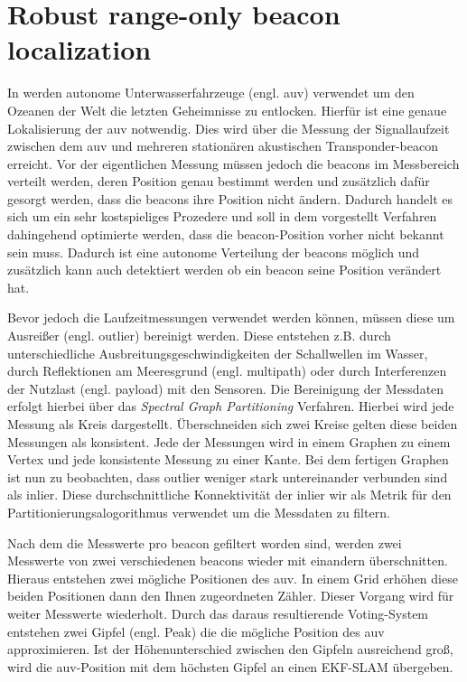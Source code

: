 \section{Robust range-only beacon localization}

In  \cite{olson2004robust} werden autonome Unterwasserfahrzeuge (engl. \gls{auv}) verwendet um den Ozeanen der Welt die letzten Geheimnisse zu entlocken. Hierfür ist eine genaue Lokalisierung der \gls{auv} notwendig. Dies wird über die Messung der Signallaufzeit zwischen dem \gls{auv} und mehreren stationären akustischen Transponder-\Gls{beacon} erreicht. Vor der eigentlichen Messung müssen jedoch die \Glspl{beacon} im Messbereich verteilt werden, deren Position genau bestimmt werden und zusätzlich dafür gesorgt werden, dass die \Glspl{beacon} ihre Position nicht ändern. Dadurch handelt es sich um ein sehr kostspieliges Prozedere und soll in dem vorgestellt Verfahren dahingehend optimierte werden, dass die \Gls{beacon}-Position vorher nicht bekannt sein muss. Dadurch ist eine autonome Verteilung der \Glspl{beacon} möglich und zusätzlich kann auch detektiert werden ob ein \Gls{beacon} seine Position verändert hat.

Bevor jedoch die Laufzeitmessungen verwendet werden können, müssen diese um Ausreißer (engl. \Gls{outlier}) bereinigt werden. Diese entstehen z.B. durch unterschiedliche Ausbreitungsgeschwindigkeiten der Schallwellen im Wasser, durch Reflektionen am Meeresgrund (engl. \Gls{multipath}) oder durch Interferenzen der Nutzlast (engl. \Gls{payload}) mit den Sensoren. Die Bereinigung der Messdaten erfolgt hierbei über das \textit{Spectral Graph Partitioning} Verfahren. Hierbei wird jede Messung als Kreis dargestellt. Überschneiden sich zwei Kreise gelten diese beiden Messungen als konsistent. Jede der Messungen wird in einem Graphen zu einem Vertex und jede konsistente Messung zu einer Kante. Bei dem fertigen Graphen ist nun zu beobachten, dass \Gls{outlier} weniger stark untereinander verbunden sind als \Gls{inlier}. Diese durchschnittliche Konnektivität der \Gls{inlier} wir als Metrik für den Partitionierungsalogorithmus verwendet um die Messdaten zu filtern.

Nach dem die Messwerte pro \Gls{beacon} gefiltert worden sind, werden zwei Messwerte von zwei verschiedenen \Glspl{beacon} wieder mit einandern überschnitten. Hieraus entstehen zwei mögliche Positionen des \gls{auv}. In einem Grid erhöhen diese beiden Positionen dann den Ihnen zugeordneten Zähler. Dieser Vorgang wird für weiter Messwerte wiederholt. Durch das daraus resultierende Voting-System entstehen zwei Gipfel (engl. Peak) die die mögliche Position des \gls{auv} approximieren. Ist der Höhenunterschied zwischen den Gipfeln ausreichend groß, wird die \gls{auv}-Position mit dem höchsten Gipfel an einen EKF-SLAM übergeben.


